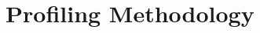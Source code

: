 \section{Profiling Methodology}
\label{app:meth}


\begin{comment}
Plenty of things can go wrong when \alts{profiling, measuring \alts{execution, run}
times}.  These are the ones I was aware of and tried to account for while doing
measurements for this \article.
\begin{itemize}
   \item \emph{CPU frequency scaling and boosting}.
      CPU frequencies are usually dynamic these days and automatically adjusted based on
      at least workload and temperature.  This should be disabled when measuring execution
      times.  I used the cpupower(1) program.
      \begin{verbatim}
         # cpupower frequency-set -g performance
         $ ./benchmark
         # cpupower frequency-set -g schedutil
      \end{verbatim}
   \item \emph{Interrupts and context switches.}  The process being timed has to share
      resources with other processes and the operating system.  A context switch will not
      only increase wall time, it will also increase cycles because of TLB flushes and
      cache evictions. %

      Processor shielding, %
      taking the minimum of several measurements, and assigning a very high priority can
      \alts{help here, mitigate these problems}.
      \begin{verbatim}
         # chrt -f 99 \time -v ./program
      \end{verbatim}
   \item \emph{CPU jumping.}
      CPU pinning (setting processor/thread affinity) may help. %
   \item \emph{Cache warmth.}
      When comparing different solutions on the same data set, later ones may benefit from 
      data having been loaded into cache already.  Checking whether swapping the order of
      measurements changes the results is a good idea.
\end{itemize}
These effects may \alts{add noise to, pollute} the results, render them irreproducible, or
invalidate them completely.


\end{comment}
